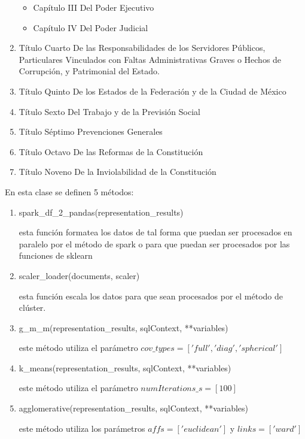 \documentclass[12pt]{article}
\begin{document}
\begin{enumerate}
\begin{itemize}
						
						\item Capítulo III Del Poder Ejecutivo
						
						\item Capítulo IV Del Poder Judicial
					\end{itemize}

				
				\item Título Cuarto De las Responsabilidades de los Servidores Públicos, Particulares Vinculados con Faltas Administrativas Graves o Hechos de Corrupción, y Patrimonial del Estado.
				
				\item Título Quinto De los Estados de la Federación y de la Ciudad de México 
				
				\item Título Sexto Del Trabajo y de la Previsión Social
				
				\item Título Séptimo Prevenciones Generales
				
				\item Título Octavo De las Reformas de la Constitución
				
				\item Título Noveno De la Inviolabilidad de la Constitución
				
			\end{enumerate}
			
			En esta clase se definen 5 métodos:

			\begin{enumerate}
				\item spark\_df\_2\_pandas(representation\_results)
				
				esta función formatea los datos de tal forma que puedan ser procesados en paralelo por el método de spark o para que puedan ser procesados por las funciones de sklearn
				
				\item scaler\_loader(documents, scaler)
				
				esta función escala los datos para que sean procesados por el método de clúster.
				
				\item g\_m\_m(representation\_results, sqlContext, **variables)
				
				este método utiliza el parámetro $cov\_types = ['full', 'diag', 'spherical']$
				
				\item k\_means(representation\_results, sqlContext, **variables)
			
				este método utiliza el parámetro $numIterations\_s = [100]$
				
				\item agglomerative(representation\_results, sqlContext, **variables)
							
				este método utiliza los parámetros $affs = ['euclidean']$ y $links = ['ward']$
				
			\end{enumerate}
						
\end{document}
